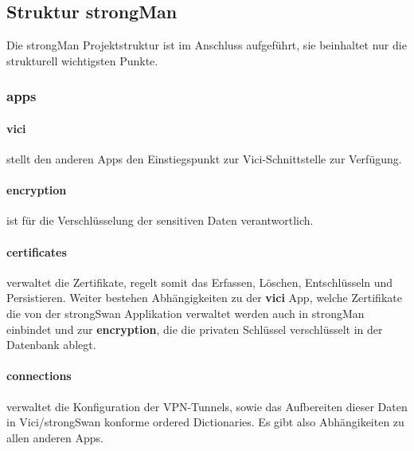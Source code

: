 \subsection{Struktur strongMan}
Die strongMan Projektstruktur ist im Anschluss aufgeführt, sie beinhaltet nur die strukturell wichtigsten Punkte.\\
\begin{figure}[H]
\end{figure}

\medskip

\subsubsection{apps}
\par
\begingroup
\leftskip=0.5cm 
\noindent
\paragraph{vici} stellt den anderen Apps den Einstiegspunkt zur Vici-Schnittstelle zur Verfügung. 

\paragraph{encryption} ist für die Verschlüsselung der sensitiven Daten verantwortlich.

\paragraph{certificates} verwaltet die Zertifikate, regelt somit das Erfassen, Löschen, Entschlüsseln und Persistieren. Weiter bestehen Abhängigkeiten zu der \textbf{vici} App, welche Zertifikate die von der strongSwan Applikation
verwaltet werden auch in strongMan einbindet und zur \textbf{encryption}, die die privaten Schlüssel verschlüsselt in der Datenbank ablegt.

\paragraph{connections} verwaltet die Konfiguration der VPN-Tunnels, sowie das Aufbereiten dieser Daten in Vici/strongSwan konforme ordered Dictionaries. Es gibt also Abhängikeiten zu allen anderen Apps.

\par
\endgroup

